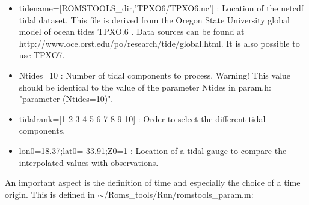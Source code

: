 \begin{itemize}
\item tidename=[ROMSTOOLS\_dir,'TPXO6/TPXO6.nc'] : Location of the netcdf tidal dataset. 
This file is derived from the Oregon State University global model of ocean tides TPXO.6 
\citep{Egb02}.  Data sources can be found at \\
http://www.oce.orst.edu/po/research/tide/global.html.
It is also possible to use TPXO7.
\item Ntides=10 : Number of tidal components to process. Warning!
This value should be identical to the value of the parameter Ntides in param.h:
"parameter (Ntides=10)".
\item tidalrank=[1 2 3 4 5 6 7 8 9 10] : Order to select the different tidal components.
\item lon0=18.37;lat0=-33.91;Z0=1 : Location of a tidal gauge to compare the interpolated values
with observations. \\
\end{itemize}
An important aspect is the definition of time and especially the choice of a 
time origin. This is defined in $\sim$/Roms\_tools/Run/romstools\_param.m:

